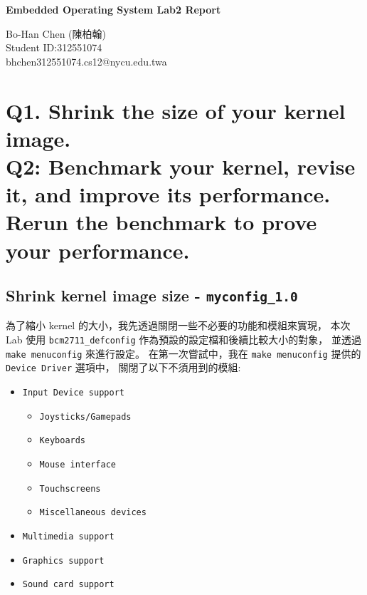 \documentclass[a4paper, oneside, final, 12pt]{scrartcl} %
\begin{document}


\begin{center}
    {\fontsize{18}{30}\textbf{Embedded Operating System Lab2 Report}}
\end{center}

\begin{center}
  Bo-Han Chen (陳柏翰) \\
  Student ID:312551074 \\
  bhchen312551074.cs12@nycu.edu.twa
\end{center}

\section{Q1. Shrink the size of your kernel image. \\ Q2: Benchmark your kernel, revise it, and improve its performance. Rerun the
benchmark to prove your performance.}

\begingroup
\raggedright

\subsection{Shrink kernel image size - \lstinline{myconfig_1.0}}

為了縮小 kernel 的大小，我先透過關閉一些不必要的功能和模組來實現，
本次 Lab 使用 \lstinline{bcm2711_defconfig} 作為預設的設定檔和後續比較大小的對象，
並透過 \lstinline{make menuconfig} 來進行設定。
在第一次嘗試中，我在 \lstinline{make menuconfig} 提供的 \lstinline{Device Driver} 選項中，
關閉了以下不須用到的模組:
\begin{itemize}
  \item \lstinline{Input Device support}
  \begin{itemize}
    \item \lstinline{Joysticks/Gamepads}
    \item \lstinline{Keyboards}
    \item \lstinline{Mouse interface}
    \item \lstinline{Touchscreens}
    \item \lstinline{Miscellaneous devices}
  \end{itemize}
  \item \lstinline{Multimedia support}
  \item \lstinline{Graphics support}
  \item \lstinline{Sound card support}
\end{itemize}
\end{document}

